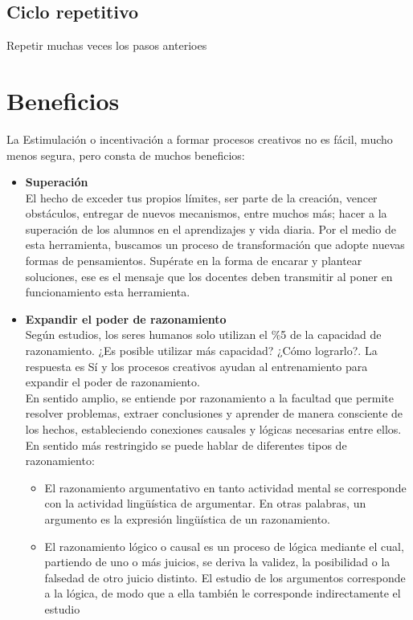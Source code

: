 \subsection{Ciclo repetitivo}
Repetir muchas veces los pasos anterioes

\section{Beneficios}
La Estimulaci\'on o incentivaci\'on a formar procesos creativos no es f\'acil, mucho menos segura, pero consta de muchos beneficios:
\begin{itemize}
 \item \textbf{Superaci\'on}\\
 El hecho de exceder tus propios l\'imites, ser parte de la creaci\'on, vencer obst\'aculos, entregar de nuevos mecanismos, entre muchos m\'as; hacer a la 
 superaci\'on de los alumnos en el aprendizajes y vida diaria. Por el medio de esta herramienta, buscamos un proceso de transformaci\'on que adopte nuevas 
 formas de pensamientos. Sup\'erate en la forma de encarar y plantear soluciones, ese es el mensaje que los docentes deben transmitir al poner en funcionamiento
 esta herramienta. 
 \item \textbf{Expandir el poder de razonamiento}\\
 Seg\'un estudios, los seres humanos solo utilizan el \%5 de la capacidad de razonamiento. ¿Es posible utilizar m\'as capacidad? ¿C\'omo lograrlo?. La respuesta
 es S\'i y los procesos creativos ayudan al entrenamiento para expandir el poder de razonamiento.\\
 En sentido amplio, se entiende por razonamiento a la facultad que permite resolver problemas, extraer conclusiones y aprender de manera consciente de los 
 hechos, estableciendo conexiones causales y lógicas necesarias entre ellos. En sentido más restringido se puede hablar de diferentes tipos de razonamiento:
 \begin{itemize}
  \item El razonamiento argumentativo en tanto actividad mental se corresponde con la actividad lingüística de argumentar. En otras palabras, un argumento es la
  expresión lingüística de un razonamiento. 
  \item El razonamiento lógico o causal es un proceso de lógica mediante el cual, partiendo de uno o más juicios, se deriva la validez, la posibilidad o la 
  falsedad de otro juicio distinto. El estudio de los argumentos corresponde a la lógica, de modo que a ella también le corresponde indirectamente el estudio 

\end{itemize}
\end{itemize}
